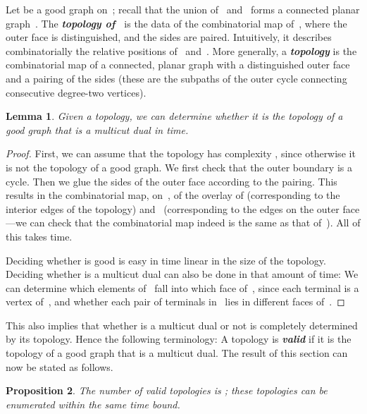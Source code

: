 \documentclass[11pt]{article}
\newcommand{\emphdef}[1]{\textcolor{blueblack}{\textbf{\emph{#1}}}}
\theoremstyle{plain}  \newtheorem{theorem}{Theorem}[section]
\newtheorem{lemma}[theorem]{Lemma}
\newtheorem{proposition}[theorem]{Proposition}
\theoremstyle{definition}
\begin{document}
Let  be a good graph on~; recall that the union of~ and~
forms a connected planar graph~.  The \emphdef{topology of~} is
the data of the combinatorial map of~, where the outer face is
distinguished, and the sides are paired.  Intuitively, it describes
combinatorially the relative positions of~ and~.  More generally, a
\emphdef{topology} is the combinatorial map of a connected, planar graph
with a distinguished outer face and a pairing of the sides (these are the
subpaths of the outer cycle connecting consecutive degree-two vertices).

\begin{lemma}\label{L:algovalid}
  Given a topology, we can determine whether it is the topology of a good
  graph that is a multicut dual in  time.
\end{lemma}
\begin{proof}
  First, we can assume that the topology has complexity , since
  otherwise it is not the topology of a good graph.  We first check that
  the outer boundary is a cycle.  Then we glue the sides of the outer face
  according to the pairing.  This results in the combinatorial map, on~,
  of the overlay of  (corresponding to the interior edges of the
  topology) and~ (corresponding to the edges on the outer face---we can
  check that the combinatorial map indeed is the same as that of~).  All
  of this takes  time.

  Deciding whether  is good is easy in time linear in the size of the
  topology.  Deciding whether  is a multicut dual can also be done in
  that amount of time: We can determine which elements of~ fall into
  which face of~, since each terminal is a vertex of~, and whether
  each pair of terminals in~ lies in different faces of~.
\end{proof}
This also implies that whether  is a multicut dual or not is completely
determined by its topology.  Hence the following terminology: A topology is
\emphdef{valid} if it is the topology of a good graph that is a multicut
dual.  The result of this section can now be stated as follows.
\begin{proposition}\label{P:enumtop}
  The number of valid topologies is ; these topologies
  can be enumerated within the same time bound.
\end{proposition}
\end{document}
